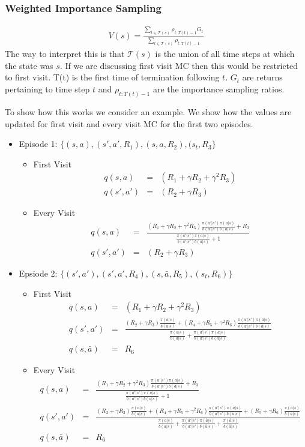 \documentclass[11pt,a4paper]{article}
\newcommand\bea{\begin{eqnarray}}
\newcommand\eea{\end{eqnarray}}
\begin{document}
\subsubsection{Weighted Importance Sampling}

\bea
V(s) = \frac{\sum_{t \in \mathcal T(s)} \rho_{t:T(t)-1} G_t}{\sum_{t \in \mathcal T(s)} \rho_{t:T(t)-1} }
\eea
The way to interpret this is that $\mathcal T(s)$ is the union of all time steps at which the state was $s$.  If we are discussing first visit MC then this would be restricted to first visit. T(t) is the first time of termination following $t$. $G_t$ are returns pertaining to time step $t$ and $ \rho_{t:T(t)-1}$ are the importance sampling ratios.

To show how this works we consider an example. We show how the values are updated for first visit and every visit MC for the first two episodes. 
\begin{itemize}
\item Episode 1: $\{(s,a),(s',a',R_1),(s,a,R_2),(s_t,R_3\}$ 
\begin{itemize}
\item First Visit
\bea
q(s,a) &=& (R_1 + \gamma R_2+\gamma^2 R_3) \\
q(s',a') &=& (R_2 + \gamma R_3)
\eea
\item Every Visit
\bea
q(s,a) &=& \frac{(R_1 + \gamma R_2+\gamma^2 R_3) \frac{\pi(a'|s') \pi(a|s)}{b(a'|s') b(a|s)}+R_3}{\frac{\pi(a'|s') \pi(a|s)}{b(a'|s') b(a|s)}+1} \\
q(s',a') &=& (R_2 + \gamma R_3) 
\eea
\end{itemize}
\item  Epsiode 2: $\{(s',a'),(s',a',R_4),(s,\bar a,R_5),(s_t,R_6)\}$
\begin{itemize}
\item First Visit
\bea
q(s,a) &=& (R_1 + \gamma R_2+\gamma^2 R_3)  \\
q(s',a') &=& \frac{(R_2 + \gamma R_3) \frac{\pi(a|s)}{b(a|s)} + (R_4 + \gamma R_5 + \gamma^2 R_6) \frac{\pi(a'|s') \pi(\bar a|s)}{b(a'|s') b(\bar a|s)}}{ \frac{\pi(a|s)}{b(a|s)} + \frac{\pi(a'|s') \pi(\bar a|s)}{b(a'|s') b(\bar a|s)}} \\
q(s,\bar a) &=& R_6
\eea
\item Every Visit
\bea
q(s,a) &=& \frac{(R_1 + \gamma R_2+\gamma^2 R_3) \frac{\pi(a'|s') \pi(a|s)}{b(a'|s') b(a|s)}+R_3}{\frac{\pi(a'|s') \pi(a|s)}{b(a'|s') b(a|s)}+1} \\
q(s',a') &=& \frac{(R_2 + \gamma R_3) \frac{\pi(a|s)}{b(a|s)} + (R_4 + \gamma R_5 + \gamma^2 R_6) \frac{\pi(a'|s') \pi(\bar a|s)}{b(a'|s') b(\bar a|s)} + (R_5+ \gamma R_6)  \frac{ \pi(\bar a|s)}{ b(\bar a|s)}}{\frac{\pi(a|s)}{b(a|s)} + \frac{\pi(a'|s') \pi(\bar a|s)}{b(a'|s') b(\bar a|s)} +\frac{ \pi(\bar a|s)}{ b(\bar a|s)}} \\
q(s,\bar a) &=& R_6
\eea
\end{itemize}
\end{itemize}
\end{document}
